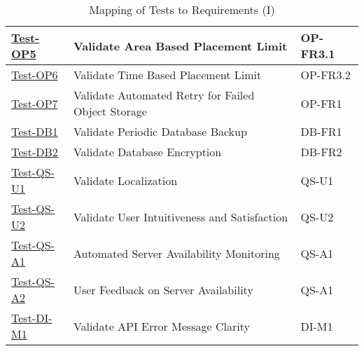 \documentclass[12pt, titlepage]{article}
\begin{document}
\begin{table}[htpb!]
\begin{tabular}{|l|p{8cm}|p{3cm}|}
    \hline
    \hyperref[itm:Test-OP5]{Test-OP5}     & Validate Area Based Placement Limit                & OP-FR3.1              \\
    \hline
    \hyperref[itm:Test-OP6]{Test-OP6}     & Validate Time Based Placement Limit                & OP-FR3.2              \\
    \hline
    \hyperref[itm:Test-OP7]{Test-OP7}     & Validate Automated Retry for Failed Object Storage & OP-FR1                \\
    \hline
    \hyperref[itm:Test-DB1]{Test-DB1}     & Validate Periodic Database Backup                  & DB-FR1                \\
    \hline
    \hyperref[itm:Test-DB2]{Test-DB2}     & Validate Database Encryption                       & DB-FR2                \\
    \hline
    \hyperref[itm:Test-QS-U1]{Test-QS-U1} & Validate Localization                              & QS-U1                 \\
    \hline
    \hyperref[itm:Test-QS-U2]{Test-QS-U2} & Validate User Intuitiveness and Satisfaction       & QS-U2                 \\
    \hline
    \hyperref[itm:Test-QS-A1]{Test-QS-A1} & Automated Server Availability Monitoring           & QS-A1                 \\
    \hline
    \hyperref[itm:Test-QS-A2]{Test-QS-A2} & User Feedback on Server Availability               & QS-A1                 \\
    \hline
    \hyperref[itm:Test-DI-M1]{Test-DI-M1} & Validate API Error Message Clarity                 & DI-M1                 \\
    \hline
  \end{tabular}
  \caption{Mapping of Tests to Requirements (I)}
  \label{tab:test_requirements1}
\end{table}
\end{document}
